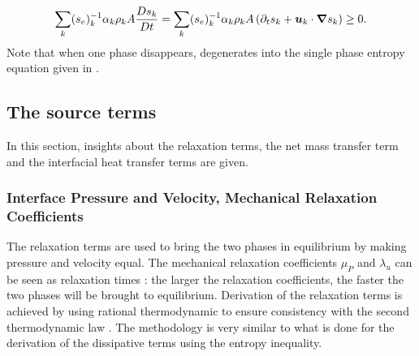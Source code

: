 %
\begin{equation}\label{eq:tot-ent-res-sct4}
\sum_k (s_{e})_k^{-1} \alpha_k \rho_k A \frac{Ds_k}{Dt} = \sum_k (s_{e})_k^{-1} \alpha_k \rho_k A \left( \partial_t s_k + \boldsymbol u_k \cdot \boldsymbol{\nabla} s_k \right) \geq 0.
\end{equation}
%
Note that when one phase disappears,  degenerates into the single phase entropy equation given in .
\subsection{The source terms}\label{sec:source-terms-7-eqt-sect5}
In this section, insights about the relaxation terms, the net mass transfer term and the interfacial heat transfer terms are given.
\subsubsection{Interface Pressure and Velocity, Mechanical Relaxation Coefficients}
The relaxation terms are used to bring the two phases in equilibrium by making pressure and velocity equal. The mechanical relaxation coefficients $\mu_P$ and $\lambda_u$ can be seen as relaxation times : the larger the relaxation coefficients, the faster the two phases will be brought to equilibrium. Derivation of the relaxation terms is achieved by using rational thermodynamic to ensure consistency with the second thermodynamic law \cite{Truesdell}. The methodology is very similar to what is done for the derivation of the dissipative terms using the entropy inequality.

